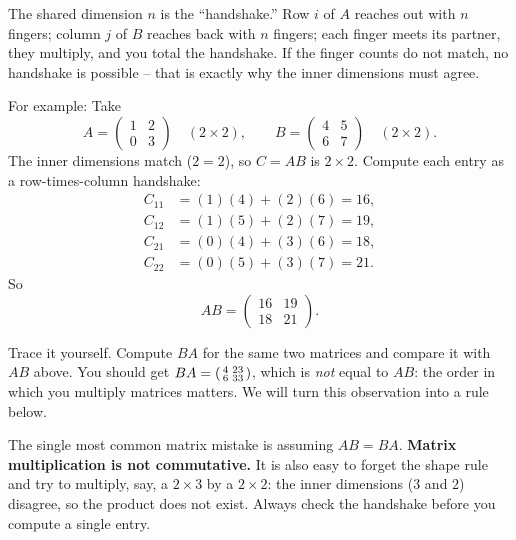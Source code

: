 \begin{intuitionbox}
The shared dimension $n$ is the ``handshake.'' Row $i$ of $A$ reaches out with $n$
fingers; column $j$ of $B$ reaches back with $n$ fingers; each finger meets its
partner, they multiply, and you total the handshake. If the finger counts do not
match, no handshake is possible -- that is exactly why the inner dimensions must
agree.
\end{intuitionbox}

For example: Take
\[
A = \begin{pmatrix} 1 & 2 \\ 0 & 3 \end{pmatrix}
\quad (2 \times 2),
\qquad
B = \begin{pmatrix} 4 & 5 \\ 6 & 7 \end{pmatrix}
\quad (2 \times 2).
\]
The inner dimensions match ($2 = 2$), so $C = AB$ is $2 \times 2$. Compute each
entry as a row-times-column handshake:
\begin{align*}
C_{11} &= (1)(4) + (2)(6) = 16, \\
C_{12} &= (1)(5) + (2)(7) = 19, \\
C_{21} &= (0)(4) + (3)(6) = 18, \\
C_{22} &= (0)(5) + (3)(7) = 21.
\end{align*}
So
\[
AB = \begin{pmatrix} 16 & 19 \\ 18 & 21 \end{pmatrix}.
\]

\begin{labbox}
Trace it yourself. Compute $BA$ for the same two matrices and compare it with
$AB$ above. You should get
$BA = \begin{psmallmatrix} 4 & 23 \\ 6 & 33 \end{psmallmatrix}$,
which is \emph{not} equal to $AB$: the order in which
you multiply matrices matters. We will turn this observation into a rule below.
\end{labbox}

\begin{trapbox}
The single most common matrix mistake is assuming $AB = BA$. \textbf{Matrix
multiplication is not commutative.} It is also easy to forget the shape rule and
try to multiply, say, a $2 \times 3$ by a $2 \times 2$: the inner dimensions
($3$ and $2$) disagree, so the product does not exist. Always check the handshake
before you compute a single entry.
\end{trapbox}

